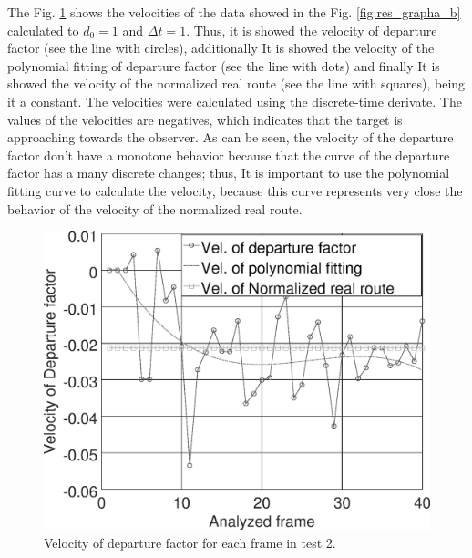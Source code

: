 The Fig. \ref{fig:res_grapha_bv} shows the velocities of the data showed in the 
Fig. \ref{fig:res_grapha_b}  calculated to $d_0=1$ and $\Delta t=1$. 
Thus, it is showed the velocity of departure factor (see the line with circles), 
additionally It is showed the velocity of the polynomial
fitting of departure factor (see the line with dots) and
finally It is showed the velocity of the normalized real route
(see the line with squares), being it a constant.
The velocities were calculated using the discrete-time derivate.
The values of the velocities are negatives, which indicates that the
target is approaching towards the observer. As can be seen,
the velocity of the departure factor don't have a monotone behavior 
because that the curve of the departure factor has a many discrete changes; thus,
It is important to use the polynomial fitting curve
to calculate the velocity, because this curve represents
very close the behavior of the velocity of the normalized real route.

\begin{figure}[!hbt]
\includegraphics[width=\columnwidth]{images/graphvelocity.eps}
\caption{Velocity of departure factor for each frame in test 2.}
\label{fig:res_grapha_bv}
\end{figure}

